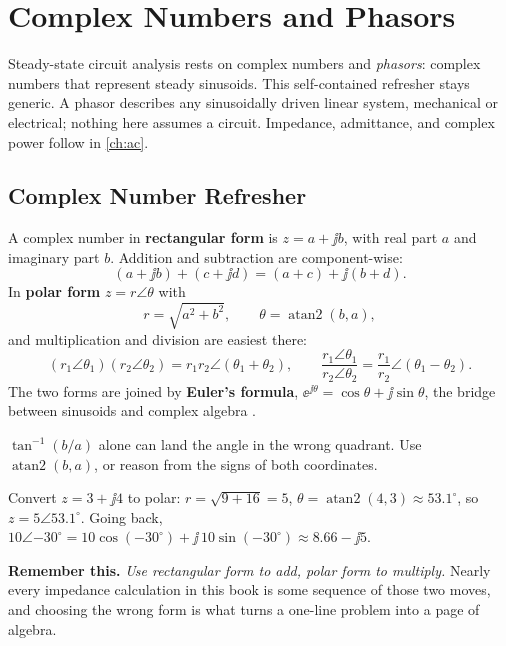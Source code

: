 \chapter{Complex Numbers and Phasors}
\label{ch:complex}
Steady-state circuit analysis rests on complex numbers and \emph{phasors}: complex
numbers that represent steady sinusoids. This self-contained refresher stays
generic. A phasor describes any sinusoidally driven linear system, mechanical or
electrical; nothing here assumes a circuit. Impedance, admittance, and complex
power follow in \cref{ch:ac}.

\section{Complex Number Refresher}
\label{sec:complexrefresher}
A complex number in \textbf{rectangular form} is \(z=a+\jj b\), with real part
\(a\) and imaginary part \(b\). Addition and subtraction are component-wise:
\[
(a+\jj b)+(c+\jj d)=(a+c)+\jj(b+d).
\]
In \textbf{polar form} \(z=r\angle\theta\) with
\[
r=\sqrt{a^2+b^2},\qquad \theta=\operatorname{atan2}(b,a),
\]
and multiplication and division are easiest there:
\[
(r_1\angle\theta_1)(r_2\angle\theta_2)=r_1r_2\angle(\theta_1+\theta_2),
\qquad
\frac{r_1\angle\theta_1}{r_2\angle\theta_2}=\frac{r_1}{r_2}\angle(\theta_1-\theta_2).
\]
The two forms are joined by \textbf{Euler's formula},
\(\ee^{\jj\theta}=\cos\theta+\jj\sin\theta\), the bridge between sinusoids and
complex algebra \cite[pp.~22--28]{white2004highfrequency}.

\begin{mistakebox}
\(\tan^{-1}(b/a)\) alone can land the angle in the wrong quadrant. Use
\(\operatorname{atan2}(b,a)\), or reason from the signs of both coordinates.
\end{mistakebox}

\begin{workedbox}
Convert \(z=3+\jj4\) to polar: \(r=\sqrt{9+16}=5\),
\(\theta=\operatorname{atan2}(4,3)\approx53.1^\circ\), so \(z=5\angle53.1^\circ\).
Going back, \(10\angle{-30^\circ}=10\cos(-30^\circ)+\jj\,10\sin(-30^\circ)
\approx 8.66-\jj5\).
\end{workedbox}

\begin{exambox}
\textbf{Remember this.} \emph{Use rectangular form to add, polar form to
multiply.} Nearly every impedance calculation in this book is some sequence of
those two moves, and choosing the wrong form is what turns a one-line problem into
a page of algebra.
\end{exambox}

